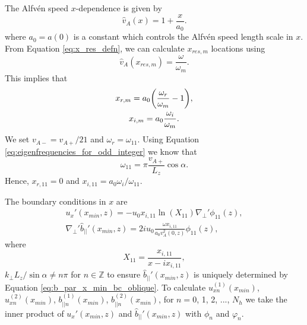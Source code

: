 The Alfv\'en speed $x$-dependence is given by
\begin{equation}
    \hat{v}_A(x)=1+\frac{x}{a_0}.
\end{equation}
where $a_0=a(0)$ is a constant which controls the Alfv\'en speed length scale in $x$. From Equation \eqref{eq:x_res_defn}, we can calculate $x_{res,m}$ locations using
\begin{equation}
    \hat{v}_A(x_{res,m}) = \frac{\omega}{\omega_m}.
\end{equation}
This implies that
\begin{gather}
    x_{r,m} = a_0\qty(\frac{\omega_r}{\omega_m}-1), \\
    x_{i,m} = a_0\frac{\omega_i}{\omega_m}.
\end{gather}
We set $v_{A-} = v_{A+}/21$ and $\omega_r = \omega_{11}$. Using Equation \eqref{eq:eigenfrequencies_for_odd_integer} we know that
\begin{equation}
    \omega_{11} = \pi\frac{v_{A+}}{L_z}\cos\alpha.
\end{equation}
Hence, $x_{r,11}=0$ and $x_{i,11} = a_0\omega_i/\omega_{11}$.

The boundary conditions in $x$ are
\begin{gather}
    \label{eq:ux_x_min_bc_oblique}
    u_x'(x_{min},z) = -u_0x_{i,11}\ln(X_{11})\nabla_\perp'\phi_{11}(z), \\
    \label{eq:b_par_x_min_bc_oblique}
    \nabla_\perp' \hat{b}_{||}'(x_{min},z)=2iu_0\frac{\omega x_{i,11}}{a_0v_A^2(0,z)}\phi_{11}(z),
\end{gather}
where
\begin{equation}
    X_{11} = \frac{x_{i,11}}{x-ix_{i,11}},
\end{equation}
$k_\perp L_z/\sin\alpha \ne n\pi$ for $n\in\mathds{Z}$ to ensure $\hat{b}_{||}'(x_{min},z)$ is uniquely determined by Equation \eqref{eq:b_par_x_min_bc_oblique}.
To calculate $u_{xn}^{(1)}(x_{min})$, $u_{xn}^{(2)}(x_{min})$, $b_{||n}^{(1)}(x_{min})$, $b_{||n}^{(2)}(x_{min})$, for $n=0$, 1, 2, ..., $N_h$ we take the inner product of $u_x'(x_{min},z)$ and $\hat{b}_{||}'(x_{min},z)$ with $\phi_n$ and $\varphi_n$.

